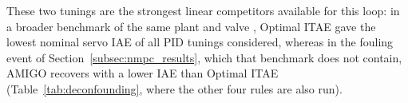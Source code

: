 These two tunings are the strongest linear competitors available for this loop: in a broader benchmark of the same plant and valve \cite{andrade2026robust}, Optimal ITAE gave the lowest nominal servo IAE of all PID tunings considered, whereas in the fouling event of Section~\ref{subsec:nmpc_results}, which that benchmark does not contain, AMIGO recovers with a lower IAE than Optimal ITAE (Table~\ref{tab:deconfounding}, where the other four rules are also run).
